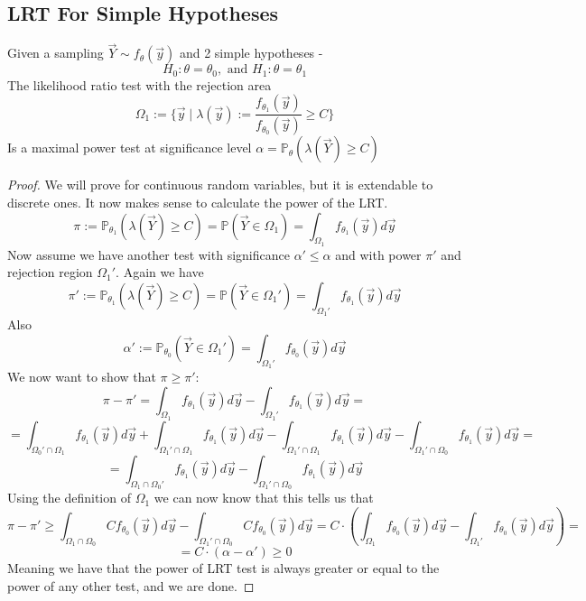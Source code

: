 \documentclass[../main.tex]{subfiles}
\begin{document}
\subsection{LRT For Simple Hypotheses}
\begin{lemma}
Given a sampling $\overrightarrow{Y}\sim f_{\theta}(\overrightarrow{y})$ and 2 simple hypotheses - 
\[H_0:\theta = \theta_0,\text{ and } H_1:\theta = \theta_1\]
The likelihood ratio test with the rejection area
\[\Omega_1:=\{\overrightarrow{y}\mid\lambda(\overrightarrow{y}):=\frac{f_{\theta_1}(\overrightarrow{y})}{f_{\theta_0}(\overrightarrow{y})}\geq C\}\]
Is a maximal power test at significance level $\alpha = \mathbb{P}_{\theta}(\lambda(\overrightarrow{Y})\geq C)$
\end{lemma}
\begin{proof}
We will prove for continuous random variables, but it is extendable to discrete ones. It now makes sense to calculate the power of the LRT. 
\[\pi:=\mathbb{P}_{\theta_1}(\lambda(\overrightarrow{Y})\geq C) = \mathbb{P}(\overrightarrow{Y}\in\Omega_1) = \int_{\Omega_1} f_{\theta_1}(\overrightarrow{y})d\overrightarrow{y}\]
Now assume we have another test with significance $\alpha'\leq \alpha$ and with power $\pi'$ and rejection region $\Omega_1'$. Again we have
\[\pi':=\mathbb{P}_{\theta_1}(\lambda(\overrightarrow{Y})\geq C) = \mathbb{P}(\overrightarrow{Y}\in\Omega_1') = \int_{\Omega_1'} f_{\theta_1}(\overrightarrow{y})d\overrightarrow{y}\]
Also
\[\alpha':=\mathbb{P}_{\theta_0}(\overrightarrow{Y}\in\Omega_1') = \int_{\Omega_1'} f_{\theta_0}(\overrightarrow{y})d\overrightarrow{y}\]
We now want to show that $\pi\geq \pi'$:
\[\pi-\pi'=\int_{\Omega_1} f_{\theta_1}(\overrightarrow{y})d\overrightarrow{y} - \int_{\Omega_1'} f_{\theta_1}(\overrightarrow{y})d\overrightarrow{y} =\]\[= \int_{\Omega_0'\cap\Omega_1} f_{\theta_1}(\overrightarrow{y})d\overrightarrow{y} + \int_{\Omega_1'\cap\Omega_1} f_{\theta_1}(\overrightarrow{y})d\overrightarrow{y} - \int_{\Omega_1'\cap\Omega_1} f_{\theta_1}(\overrightarrow{y})d\overrightarrow{y} - \int_{\Omega_1'\cap\Omega_0} f_{\theta_1}(\overrightarrow{y})d\overrightarrow{y}=\]\[=\int_{\Omega_1\cap\Omega_0'} f_{\theta_1}(\overrightarrow{y})d\overrightarrow{y} - \int_{\Omega_1'\cap\Omega_0} f_{\theta_1}(\overrightarrow{y})d\overrightarrow{y}\]
Using the definition of $\Omega_1$ we can now know that this tells us that
\[\pi-\pi'\geq \int_{\Omega_1\cap\Omega_0} Cf_{\theta_0}(\overrightarrow{y})d\overrightarrow{y} - \int_{\Omega_1'\cap\Omega_0} Cf_{\theta_0}(\overrightarrow{y})d\overrightarrow{y} = C\cdot\left(\int_{\Omega_1} f_{\theta_0}(\overrightarrow{y})d\overrightarrow{y}- \int_{\Omega_1'} f_{\theta_0}(\overrightarrow{y})d\overrightarrow{y}\right) = \]\[=C\cdot(\alpha-\alpha')\geq 0\]
Meaning we have that the power of LRT test is always greater or equal to the power of any other test, and we are done. 
\end{proof}
\end{document}
